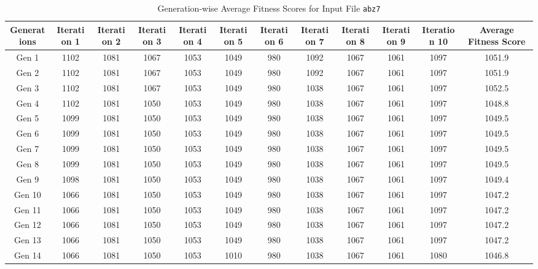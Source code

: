 \documentclass[12pt]{article}
\begin{document}
\begin{table}[h]
    \centering
    \caption{Generation-wise Average Fitness Scores for Input File \texttt{abz7}}
    \label{tab:average_fitness_scores_abz6}
    \begin{adjustbox}{max width=1\textwidth} %
        \begin{tabular}{*{12}{c}}
            \toprule
            Generations & Iteration 1 & Iteration 2 & Iteration 3 & Iteration 4 & Iteration 5 & Iteration 6 & Iteration 7 & Iteration 8 & Iteration 9 & Iteration 10 & Average Fitness Score \\
            \midrule
            Gen 1 & 1102 & 1081 & 1067 & 1053 & 1049 & 980 & 1092 & 1067 & 1061 & 1097 & 1051.9 \\
            Gen 2 & 1102 & 1081 & 1067 & 1053 & 1049 & 980 & 1092 & 1067 & 1061 & 1097 & 1051.9 \\
            Gen 3 & 1102 & 1081 & 1067 & 1053 & 1049 & 980 & 1038 & 1067 & 1061 & 1097 & 1052.5 \\
            Gen 4 & 1102 & 1081 & 1050 & 1053 & 1049 & 980 & 1038 & 1067 & 1061 & 1097 & 1048.8 \\
            Gen 5 & 1099 & 1081 & 1050 & 1053 & 1049 & 980 & 1038 & 1067 & 1061 & 1097 & 1049.5 \\
            Gen 6 & 1099 & 1081 & 1050 & 1053 & 1049 & 980 & 1038 & 1067 & 1061 & 1097 & 1049.5 \\
            Gen 7 & 1099 & 1081 & 1050 & 1053 & 1049 & 980 & 1038 & 1067 & 1061 & 1097 & 1049.5 \\
            Gen 8 & 1099 & 1081 & 1050 & 1053 & 1049 & 980 & 1038 & 1067 & 1061 & 1097 & 1049.5 \\
            Gen 9 & 1098 & 1081 & 1050 & 1053 & 1049 & 980 & 1038 & 1067 & 1061 & 1097 & 1049.4 \\
            Gen 10 & 1066 & 1081 & 1050 & 1053 & 1049 & 980 & 1038 & 1067 & 1061 & 1097 & 1047.2 \\
            Gen 11 & 1066 & 1081 & 1050 & 1053 & 1049 & 980 & 1038 & 1067 & 1061 & 1097 & 1047.2 \\
            Gen 12 & 1066 & 1081 & 1050 & 1053 & 1049 & 980 & 1038 & 1067 & 1061 & 1097 & 1047.2 \\
            Gen 13 & 1066 & 1081 & 1050 & 1053 & 1049 & 980 & 1038 & 1067 & 1061 & 1097 & 1047.2 \\
            Gen 14 & 1066 & 1081 & 1050 & 1053 & 1010 & 980 & 1038 & 1067 & 1061 & 1080 & 1046.8 \\

\end{tabular}
\end{adjustbox}
\end{table}
\end{document}
